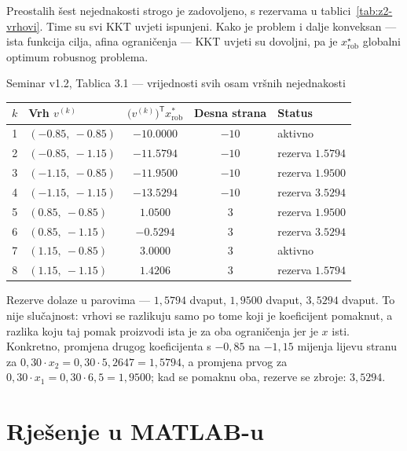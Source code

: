 Preostalih šest nejednakosti strogo je zadovoljeno, s rezervama u
tablici~\ref{tab:z2-vrhovi}. Time su svi KKT uvjeti ispunjeni. Kako je problem i
dalje konveksan --- ista funkcija cilja, afina ograničenja --- KKT uvjeti su
dovoljni, pa je $x_{\mathrm{rob}}^{\star}$ globalni optimum robusnog problema.

\begin{seminar}{Seminar v1.2, Tablica 3.1 --- vrijednosti svih osam vršnih nejednakosti}
\begin{center}
\begin{tabular}{clccl}
\toprule
$k$ & \textbf{Vrh} $v^{(k)}$ & $\bigl(v^{(k)}\bigr)^{\mathsf{T}} x_{\mathrm{rob}}^*$ & \textbf{Desna strana} & \textbf{Status} \\
\midrule
1 & $(-0.85,\ -0.85)$ & $-10.0000$ & $-10$ & aktivno \\
2 & $(-0.85,\ -1.15)$ & $-11.5794$ & $-10$ & rezerva $1.5794$ \\
3 & $(-1.15,\ -0.85)$ & $-11.9500$ & $-10$ & rezerva $1.9500$ \\
4 & $(-1.15,\ -1.15)$ & $-13.5294$ & $-10$ & rezerva $3.5294$ \\
5 & $(0.85,\ -0.85)$  & $1.0500$   & $3$   & rezerva $1.9500$ \\
6 & $(0.85,\ -1.15)$  & $-0.5294$  & $3$   & rezerva $3.5294$ \\
7 & $(1.15,\ -0.85)$  & $3.0000$   & $3$   & aktivno \\
8 & $(1.15,\ -1.15)$  & $1.4206$   & $3$   & rezerva $1.5794$ \\
\bottomrule
\end{tabular}
\end{center}
\end{seminar}

\begin{korak}
Rezerve dolaze u parovima --- $1{,}5794$ dvaput, $1{,}9500$ dvaput, $3{,}5294$
dvaput. To nije slučajnost: vrhovi se razlikuju samo po tome koji je koeficijent
pomaknut, a razlika koju taj pomak proizvodi ista je za oba ograničenja jer je
$x$ isti. Konkretno, promjena drugog koeficijenta s $-0{,}85$ na $-1{,}15$
mijenja lijevu stranu za $0{,}30 \cdot x_2 = 0{,}30 \cdot 5{,}2647 = 1{,}5794$, a
promjena prvog za $0{,}30 \cdot x_1 = 0{,}30 \cdot 6{,}5 = 1{,}9500$; kad se
pomaknu oba, rezerve se zbroje: $3{,}5294$.
\end{korak}

\section{Rješenje u MATLAB-u}
\label{sec:z2-matlab}

